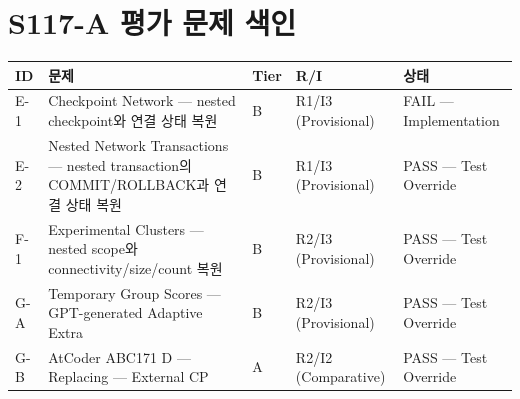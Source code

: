 \chapter{S117-A 평가 문제 색인}
\begin{longtable}{p{1.8cm}p{5.5cm}p{2.0cm}p{1.8cm}p{2.2cm}}
\toprule
\textbf{ID} & \textbf{문제} & \textbf{Tier} & \textbf{R/I} & \textbf{상태} \\
\midrule
E-1 & Checkpoint Network --- nested checkpoint와 연결 상태 복원 & B & R1/I3 (Provisional) & FAIL --- Implementation \\
E-2 & Nested Network Transactions --- nested transaction의 COMMIT/ROLLBACK과 연결 상태 복원 & B & R1/I3 (Provisional) & PASS --- Test Override \\
F-1 & Experimental Clusters --- nested scope와 connectivity/size/count 복원 & B & R2/I3 (Provisional) & PASS --- Test Override \\
G-A & Temporary Group Scores --- GPT-generated Adaptive Extra & B & R2/I3 (Provisional) & PASS --- Test Override \\
G-B & AtCoder ABC171 D --- Replacing --- External CP & A & R2/I2 (Comparative) & PASS --- Test Override \\
\bottomrule
\end{longtable}
